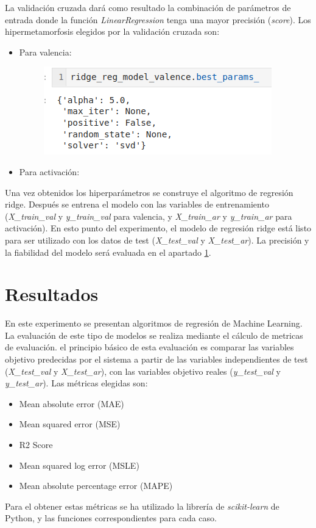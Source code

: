 \documentclass[12pt,a4paper,Spanish]{article}
\begin{document}
La validación cruzada dará como resultado la combinación de parámetros de entrada donde la función \textit{LinearRegression} tenga una mayor precisión (\textit{score}). Los hipermetamorfosis elegidos por la validación cruzada son:
\begin{itemize}
	\item Para valencia:
	\begin{figure}[H]
		\centering
		\includegraphics[width=0.5\linewidth]{figs/final_params_ridge_valence}
		\caption{}
		\label{fig:finalparamsridgevalence}
	\end{figure}
	\item Para activación:
\end{itemize}
Una vez obtenidos los hiperparámetros se construye el algoritmo de regresión ridge. Después se entrena el modelo con las variables de entrenamiento (\textit{X\_train\_val} y \textit{y\_train\_val} para valencia, y \textit{X\_train\_ar} y \textit{y\_train\_ar} para activación).
\newline
En esto punto del experimento, el modelo de regresión ridge está listo para ser utilizado con los datos de test (\textit{X\_test\_val} y \textit{X\_test\_ar}). La precisión y la fiabilidad del modelo será evaluada en el apartado \ref{resultados}.









\newpage
\section{Resultados}\label{resultados}
En este experimento se presentan algoritmos de regresión de Machine Learning. La evaluación de este tipo de modelos se realiza mediante el cálculo de metricas de evaluación. el principio básico de esta evaluación es comparar las variables objetivo predecidas por el sistema a partir de las variables independientes de test (\textit{X\_test\_val} y \textit{X\_test\_ar}), con las variables objetivo reales (\textit{y\_test\_val} y \textit{y\_test\_ar}). Las métricas elegidas son:
\begin{itemize}
	\item Mean absolute error (MAE)
	\item Mean squared error (MSE)
	\item R2 Score
	\item Mean squared log error (MSLE)
	\item Mean absolute percentage error (MAPE)
\end{itemize}
Para el obtener estas métricas se ha utilizado la librería de \textit{scikit-learn} de Python, y las funciones correspondientes para cada caso.
\end{document}
